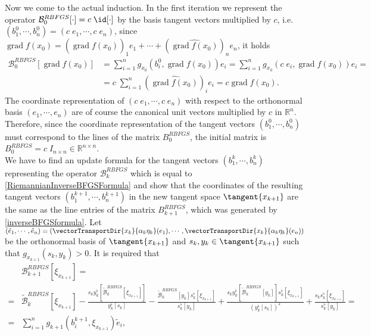 Now we come to the actual induction. In the first iteration we represent the operator $\mathcal{B}^{RBFGS}_0[\cdot] = c \; \id[\cdot]$ by the basis tangent vectors multiplied by $c$, i.e. $(b^{0}_1, \cdots, b^{0}_n) = (c \; e_1, \cdots, c \; e_n)$, since $\operatorname{grad} f(x_0) = (\widehat{\operatorname{grad} f(x_0)})_1 e_1 + \cdots + (\widehat{\operatorname{grad} f(x_0)})_n e_n$, it holds
\begin{align*}
    \mathcal{B}^{RBFGS}_0[\operatorname{grad} f(x_0)] & = \sum^{n}_{i=1} g_{x_0} (b^{0}_i, \operatorname{grad} f(x_0)) e_i = \sum^{n}_{i=1} g_{x_0} (c \; e_i, \operatorname{grad} f(x_0)) e_i = \\
     & = c \; \sum^{n}_{i=1} (\widehat{\operatorname{grad} f(x_0)})_i e_i = c \operatorname{grad} f(x_0).
\end{align*}
The coordinate representation of $(c \; e_1, \cdots, c \; e_n)$ with respect to the orthonormal basis $(e_1, \cdots, e_n)$ are of course the canonical unit vectors multiplied by $c$ in $\mathbb{R}^n$. Therefore, since the coordinate representation of the tangent vectors $(b^{0}_1, \cdots, b^{0}_n)$ must correspond to the lines of the matrix $B^{RBFGS}_0$, the initial matrix is $B^{RBFGS}_0 = c \; I_{n \times n} \in \mathbb{R}^{n \times n}$. \\
We have to find an update formula for the tangent vectors $(b^{k}_1, \cdots, b^{k}_n)$ representing the operator $\mathcal{B}^{RBFGS}_k$ which is equal to \cref{RiemannianInverseBFGSFormula} and show that the coordinates of the resulting tangent vectors $(b^{k+1}_1, \cdots, b^{k+1}_n)$ in the new tangent space $\tangent{x_{k+1}}$ are the same as the line entries of the matrix $B^{RBFGS}_{k+1}$, which was generated by \cref{inverseBFGSformula}. Let $(\tilde{e}_1, \cdots, \tilde{e}_n) = (\vectorTransportDir{x_k}{\alpha_k \eta_k} (e_1), \cdots, \vectorTransportDir{x_k}{\alpha_k \eta_k} (e_n))$ be the orthonormal basis of $\tangent{x_{k+1}}$ and $s_k, y_k \in \tangent{x_{k+1}}$ such that $g_{x_{k+1}}(s_k, y_k) > 0$. It is required that 
\begin{align*}
    & \mathcal{B}^{RBFGS}_{k+1} [\xi_{x_{k+1}}] = \\ 
    = & \widetilde{\mathcal{B}}^{RBFGS}_k [\xi_{x_{k+1}}] - \frac{s_k y^{\flat}_k[\widetilde{\mathcal{B}}^{RBFGS}_k [\xi_{x_{k+1}}]]}{y^{\flat}_k [s_k]} - \frac{\widetilde{\mathcal{B}}^{RBFGS}_k [y_k] s^{\flat}_k [\xi_{x_{k+1}}]}{s^{\flat}_k [y_k]} + \frac{s_k y^{\flat}_k[\widetilde{\mathcal{B}}^{RBFGS}_k [y_k]]s^{\flat}_k [\xi_{x_{k+1}}]}{(y^{\flat}_k [s_k])^2} + \frac{s_k s^{\flat}_k [\xi_{x_{k+1}}]}{s^{\flat}_k [y_k]} = \\
     = &\sum^{n}_{i=1} g_{k+1} (b^{k+1}_i, \xi_{x_{k+1}}) \tilde{e}_i,
\end{align*}
